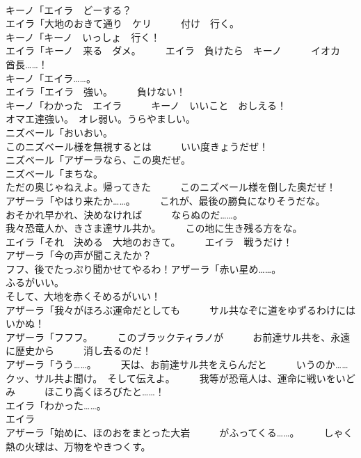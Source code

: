 \documentclass[8pt]{extreport}
\begin{document}
\begin{CJK}{UTF8}{min}
\\	キーノ「エイラ　どーする？	
\\	エイラ「大地のおきて通り　ケリ　　　付け　行く。	
\\	キーノ「キーノ　いっしょ　行く！	
\\	エイラ「キーノ　来る　ダメ。　　　エイラ　負けたら　キーノ　　　イオカ　酋長……！	
\\	キーノ「エイラ……。	
\\	エイラ「エイラ　強い。　　　負けない！	
\\	キーノ「わかった　エイラ　　　キーノ　いいこと　おしえる！	
\\	オマエ達強い。　オレ弱い。うらやましい。	
\\	ニズベール「おいおい。	
\\	このニズベール様を無視するとは　　　いい度きょうだぜ！	
\\	ニズベール「アザーラなら、この奥だぜ。	
\\	ニズベール「まちな。	
\\	ただの奥じゃねえよ。帰ってきた　　　このニズベール様を倒した奥だぜ！	
\\	アザーラ「やはり来たか……。　　　これが、最後の勝負になりそうだな。　　　おそかれ早かれ、決めなければ　　　ならぬのだ……。	
\\	我々恐竜人か、きさま達サル共か。　　　この地に生き残る方をな。	
\\	エイラ「それ　決める　大地のおきて。　　　エイラ　戦うだけ！	
\\	アザーラ「今の声が聞こえたか？	
\\	フフ、後でたっぷり聞かせてやるわ！アザーラ「赤い星め……。	
\\	ふるがいい。	
\\	そして、大地を赤くそめるがいい！	
\\	アザーラ「我々がほろぶ運命だとしても　　　サル共なぞに道をゆずるわけには　　　いかぬ！	
\\	アザーラ「フフフ。　　　このブラックティラノが　　　お前達サル共を、永遠に歴史から　　　消し去るのだ！	
\\	アザーラ「うう……。　　　天は、お前達サル共をえらんだと　　　いうのか……	
\\	クッ、サル共よ聞け。　そして伝えよ。　　　我等が恐竜人は、運命に戦いをいどみ　　　ほこり高くほろびたと……！	
\\	エイラ「わかった……。	
\\	エイラ
\\	アザーラ「始めに、ほのおをまとった大岩　　　がふってくる……。　　　しゃく熱の火球は、万物をやきつくす。	

\end{CJK}
\end{document}
